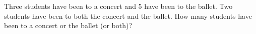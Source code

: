 Three students have been to a concert and $5$ have been to the ballet. Two students have been to both the concert and the ballet. How many students have been to a concert or the ballet (or both)?
